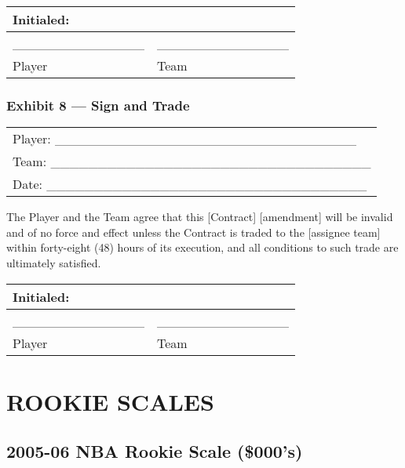 \documentclass[
]{book}
\begin{document}
\begin{longtable}[]{@{}ll@{}}
\toprule()
Initialed: & \\
\midrule()
\endhead
\_\_\_\_\_\_\_\_\_\_\_\_\_\_ & \_\_\_\_\_\_\_\_\_\_\_\_\_\_ \\
Player & Team \\
\bottomrule()
\end{longtable}

\hypertarget{exhibit-8-sign-and-trade}{%
\subsection{Exhibit 8 --- Sign and Trade}\label{exhibit-8-sign-and-trade}}

\begin{longtable}[]{@{}l@{}}
\toprule()
\endhead
Player: \_\_\_\_\_\_\_\_\_\_\_\_\_\_\_\_\_\_\_\_\_\_\_\_\_\_\_\_\_\_\_\_ \\
Team: \_\_\_\_\_\_\_\_\_\_\_\_\_\_\_\_\_\_\_\_\_\_\_\_\_\_\_\_\_\_\_\_\_\_ \\
Date: \_\_\_\_\_\_\_\_\_\_\_\_\_\_\_\_\_\_\_\_\_\_\_\_\_\_\_\_\_\_\_\_\_\_ \\
\bottomrule()
\end{longtable}

The Player and the Team agree that this {[}Contract{]} {[}amendment{]} will be invalid and of no force and effect unless the Contract is traded to the {[}assignee team{]} within forty-eight (48) hours of its execution, and all conditions to such trade are ultimately satisfied.

\begin{longtable}[]{@{}ll@{}}
\toprule()
Initialed: & \\
\midrule()
\endhead
\_\_\_\_\_\_\_\_\_\_\_\_\_\_ & \_\_\_\_\_\_\_\_\_\_\_\_\_\_ \\
Player & Team \\
\bottomrule()
\end{longtable}

\hypertarget{rookie-scales}{%
\chapter{ROOKIE SCALES}\label{rookie-scales}}

\newpage

\hypertarget{nba-rookie-scale-000s}{%
\section{2005-06 NBA Rookie Scale (\$000's)}\label{nba-rookie-scale-000s}}
\end{document}
